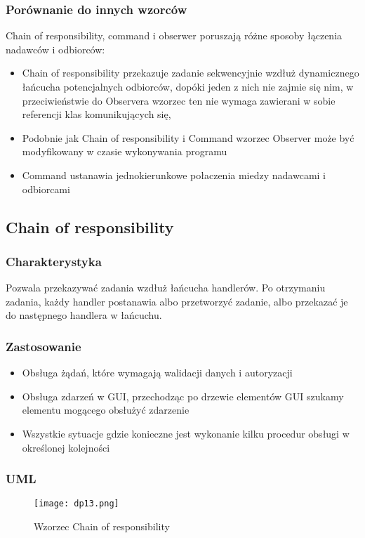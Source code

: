 \documentclass[a4paper,15pt]{article}
\begin{document}
\subsubsection{Porównanie do innych wzorców}

Chain of responsibility, command i obserwer poruszają różne sposoby łączenia nadawców i odbiorców: 

\begin{itemize}
\item Chain of responsibility przekazuje zadanie sekwencyjnie wzdłuż dynamicznego łańcucha potencjalnych odbiorców, dopóki jeden z nich
nie zajmie się nim, w przeciwieństwie do Observera wzorzec ten nie wymaga zawierani w sobie referencji klas komunikujących się, 
\item Podobnie jak Chain of responsibility i Command wzorzec Observer może być modyfikowany w czasie wykonywania programu 
\item  Command ustanawia jednokierunkowe połaczenia miedzy nadawcami i odbiorcami
\end{itemize}


\newpage
\subsection{Chain of responsibility}


\subsubsection{Charakterystyka}
Pozwala przekazywać zadania wzdłuż łańcucha handlerów. Po otrzymaniu zadania, każdy handler postanawia albo przetworzyć zadanie, albo przekazać je do następnego handlera w łańcuchu.

\subsubsection{Zastosowanie}
\begin{itemize}
\item Obsługa żądań, które wymagają walidacji danych i autoryzacji
\item Obsługa zdarzeń w GUI, przechodząc po drzewie elementów GUI szukamy elementu mogącego obsłużyć zdarzenie
\item Wszystkie sytuacje gdzie konieczne jest wykonanie kilku procedur obsługi w określonej kolejności
\end{itemize}

\subsubsection{UML}
\begin{figure}[H]
\centering
  \texttt{[image: dp13.png]}
  \caption{Wzorzec Chain of responsibility}
\end{figure}
\end{document}
